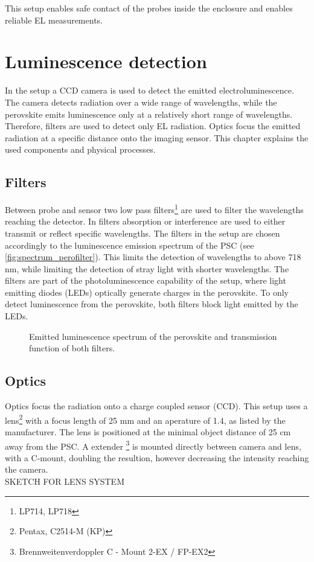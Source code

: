 This setup enables safe contact of the probes inside the enclosure and enables reliable EL measurements.

\section{Luminescence detection}\label{sec:luminescencedetection}
In the setup a CCD camera is used to detect the emitted electroluminescence. The camera detects radiation over a wide range of wavelengths, while the perovskite emits luminescence only at a relatively short range of wavelengths. Therefore, filters are used to detect only EL radiation. Optics focus the emitted radiation at a specific distance onto the imaging sensor. This chapter explains the used components and physical processes.
\subsection{Filters}
Between probe and sensor two low pass filters\footnote{LP714, LP718} are used to filter the wavelengths reaching the detector. In filters absorption or interference are used to either transmit or reflect specific wavelengths. The filters in the setup are chosen accordingly to the luminescence emission spectrum of the PSC (see \autoref{fig:spectrum_perofilter}). This limits the detection of wavelengths to above 718 nm, while limiting the detection of stray light with shorter wavelengths. The filters are part of the photoluminescence capability of the setup, where light emitting diodes (LEDs) optically generate charges in the perovskite. To only detect luminescence from the perovskite, both filters block light emitted by the LEDs.

\begin{figure}[h]
	\centering
	
	\caption{Emitted luminescence spectrum of the perovskite and transmission function of both filters. }
	\label{fig:spectrum_perofilter}
\end{figure}
\subsection{Optics}
Optics focus the radiation onto a charge coupled sensor (CCD). This setup uses a lens\footnote{Pentax, C2514-M (KP)} with a focus length of 25 mm and an aperature of 1.4, as listed by the manufacturer. The lens is positioned at the minimal object distance of  25 cm away from the PSC. A extender \footnote{Brennweitenverdoppler C - Mount 2-EX / FP-EX2} is mounted directly between camera and lens, with a C-mount, doubling the resultion, however decreasing the intensity reaching the camera.
\\
SKETCH FOR LENS SYSTEM
\\


